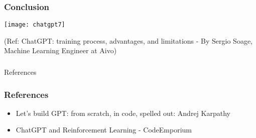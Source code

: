 \begin{frame}[fragile]\frametitle{Conclusion}



			\begin{center}
			\texttt{[image: chatgpt7]}
			
			\end{center}		
			
			{\tiny (Ref: ChatGPT: training process, advantages, and limitations - By Sergio Soage, Machine Learning Engineer at Aivo)}
			

\end{frame}

\begin{frame}[fragile]\frametitle{}
\begin{center}
{\Large References}
\end{center}
\end{frame}

\begin{frame}[fragile]\frametitle{References}
		\begin{itemize}
		\item Let's build GPT: from scratch, in code, spelled out: Andrej Karpathy
		\item ChatGPT and Reinforcement Learning - CodeEmporium
		\end{itemize}
\end{frame}
